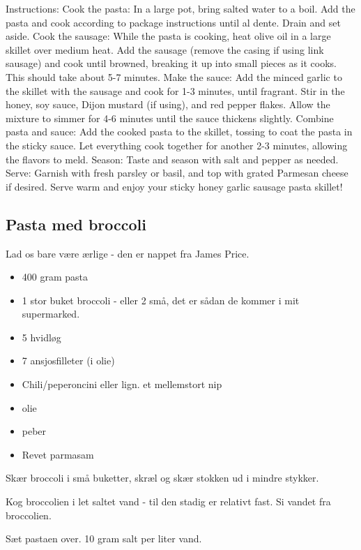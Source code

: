 \documentclass[
]{book}
\providecommand{\tightlist}{%
  \setlength{\itemsep}{0pt}\setlength{\parskip}{0pt}}
\begin{document}
Instructions:
Cook the pasta: In a large pot, bring salted water to a boil. Add the pasta and cook according to package instructions until al dente. Drain and set aside.
Cook the sausage: While the pasta is cooking, heat olive oil in a large skillet over medium heat. Add the sausage (remove the casing if using link sausage) and cook until browned, breaking it up into small pieces as it cooks. This should take about 5-7 minutes.
Make the sauce: Add the minced garlic to the skillet with the sausage and cook for 1-3 minutes, until fragrant. Stir in the honey, soy sauce, Dijon mustard (if using), and red pepper flakes. Allow the mixture to simmer for 4-6 minutes until the sauce thickens slightly.
Combine pasta and sauce: Add the cooked pasta to the skillet, tossing to coat the pasta in the sticky sauce. Let everything cook together for another 2-3 minutes, allowing the flavors to meld.
Season: Taste and season with salt and pepper as needed.
Serve: Garnish with fresh parsley or basil, and top with grated Parmesan cheese if desired. Serve warm and enjoy your sticky honey garlic sausage pasta skillet!

\subsection{Pasta med broccoli}\label{pasta-med-broccoli-1}

Lad os bare være ærlige - den er nappet fra James Price.

\begin{itemize}
\tightlist
\item
  400 gram pasta
\item
  1 stor buket broccoli - eller 2 små, det er sådan de kommer i mit supermarked.
\item
  5 hvidløg
\item
  7 ansjosfilleter (i olie)
\item
  Chili/peperoncini eller lign. et mellemstort nip
\item
  olie
\item
  peber
\item
  Revet parmasam
\end{itemize}

Skær broccoli i små buketter, skræl og skær stokken ud i mindre stykker.

Kog broccolien i let saltet vand - til den stadig er relativt fast. Si vandet fra broccolien.

Sæt pastaen over. 10 gram salt per liter vand.
\end{document}
